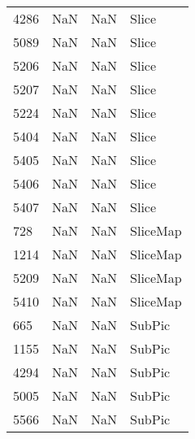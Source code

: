 \begin{tabular}{llll}
4286 &                   NaN &                        NaN &                                     Slice \\
5089 &                   NaN &                        NaN &                                     Slice \\
5206 &                   NaN &                        NaN &                                     Slice \\
5207 &                   NaN &                        NaN &                                     Slice \\
5224 &                   NaN &                        NaN &                                     Slice \\
5404 &                   NaN &                        NaN &                                     Slice \\
5405 &                   NaN &                        NaN &                                     Slice \\
5406 &                   NaN &                        NaN &                                     Slice \\
5407 &                   NaN &                        NaN &                                     Slice \\
728  &                   NaN &                        NaN &                                  SliceMap \\
1214 &                   NaN &                        NaN &                                  SliceMap \\
5209 &                   NaN &                        NaN &                                  SliceMap \\
5410 &                   NaN &                        NaN &                                  SliceMap \\
665  &                   NaN &                        NaN &                                    SubPic \\
1155 &                   NaN &                        NaN &                                    SubPic \\
4294 &                   NaN &                        NaN &                                    SubPic \\
5005 &                   NaN &                        NaN &                                    SubPic \\
5566 &                   NaN &                        NaN &                                    SubPic \\

\end{tabular}

